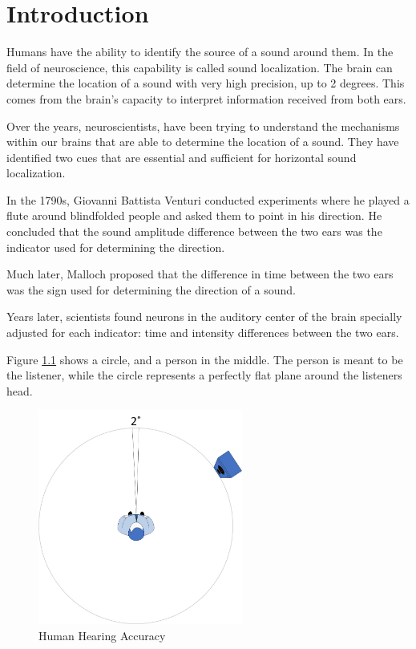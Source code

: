 \chapter{Introduction}\label{ch:introduction}
Humans have the ability to identify the source of a sound around them. In the 
field of neuroscience, this capability is called sound localization. The brain
can determine the location of a sound with very high precision, up to 2 degrees. 
This comes from the brain's capacity to interpret information received
from both ears.

Over the years, neuroscientists, have been trying to understand the mechanisms 
within our brains that are able to determine the location of a sound. They have 
identified two cues that are essential and sufficient for horizontal sound
localization.

In the 1790s, Giovanni Battista Venturi conducted experiments where he played a 
flute around blindfolded people and asked them to point in his direction. 
He concluded that the sound amplitude difference between the two ears was the 
indicator used for determining the direction.

Much later, Malloch proposed that the difference in time between the two ears 
was the sign used for determining the direction of a sound.

Years later, scientists found neurons in the auditory center of the brain
specially adjusted for each indicator: time and intensity differences between 
the two ears.

\newpage

Figure \ref{fig:humanHearingAccuracy} shows a circle, and a person in the middle. 
The person is meant to be the listener, while the circle represents a perfectly 
flat plane around the listeners head.
 
\begin{figure}[htp]
	\centering
	\includegraphics[width = 0.6\textwidth]{Illustrations/personHearingAccuracy.jpg}
	\caption{Human Hearing Accuracy}
	\label{fig:humanHearingAccuracy}
\end{figure}

